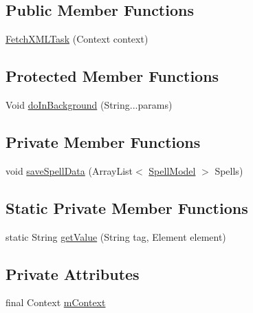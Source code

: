 \subsection*{Public Member Functions}
\begin{DoxyCompactItemize}
\item 
\hyperlink{classorg_1_1buildmlearn_1_1learnspellings_1_1data_1_1FetchXMLTask_ac412a13a3c5bf1292d2aa1dcc5a41bb1}{Fetch\+X\+M\+L\+Task} (Context context)
\end{DoxyCompactItemize}
\subsection*{Protected Member Functions}
\begin{DoxyCompactItemize}
\item 
Void \hyperlink{classorg_1_1buildmlearn_1_1learnspellings_1_1data_1_1FetchXMLTask_ae78c5e9809d077ac4c0f634d0e664d82}{do\+In\+Background} (String...\+params)
\end{DoxyCompactItemize}
\subsection*{Private Member Functions}
\begin{DoxyCompactItemize}
\item 
void \hyperlink{classorg_1_1buildmlearn_1_1learnspellings_1_1data_1_1FetchXMLTask_a963911f2bd3f54bde6fdff4b77c1940a}{save\+Spell\+Data} (Array\+List$<$ \hyperlink{classorg_1_1buildmlearn_1_1learnspellings_1_1data_1_1SpellModel}{Spell\+Model} $>$ Spells)
\end{DoxyCompactItemize}
\subsection*{Static Private Member Functions}
\begin{DoxyCompactItemize}
\item 
static String \hyperlink{classorg_1_1buildmlearn_1_1learnspellings_1_1data_1_1FetchXMLTask_aea99b8bdf3785e498c02b3eed8b7fc4f}{get\+Value} (String tag, Element element)
\end{DoxyCompactItemize}
\subsection*{Private Attributes}
\begin{DoxyCompactItemize}
\item 
final Context \hyperlink{classorg_1_1buildmlearn_1_1learnspellings_1_1data_1_1FetchXMLTask_a01de5e65c80c0f4cecdc2dd0db38196d}{m\+Context}
\end{DoxyCompactItemize}


